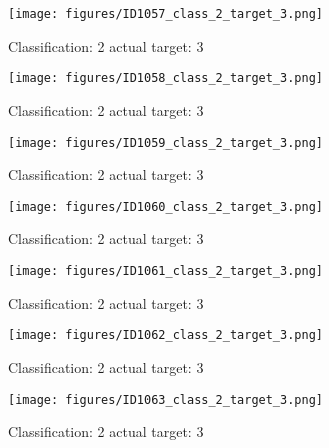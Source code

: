 \begin{figure}[h!]
\begin{center}
\texttt{[image: figures/ID1057\_class\_2\_target\_3.png]}
\end{center}
\caption{ Classification: 2 actual target: 3}
\label{fig:ID1057_class_2_target_3}
\end{figure}
\begin{figure}[h!]
\begin{center}
\texttt{[image: figures/ID1058\_class\_2\_target\_3.png]}
\end{center}
\caption{ Classification: 2 actual target: 3}
\label{fig:ID1058_class_2_target_3}
\end{figure}
\begin{figure}[h!]
\begin{center}
\texttt{[image: figures/ID1059\_class\_2\_target\_3.png]}
\end{center}
\caption{ Classification: 2 actual target: 3}
\label{fig:ID1059_class_2_target_3}
\end{figure}
\begin{figure}[h!]
\begin{center}
\texttt{[image: figures/ID1060\_class\_2\_target\_3.png]}
\end{center}
\caption{ Classification: 2 actual target: 3}
\label{fig:ID1060_class_2_target_3}
\end{figure}
\begin{figure}[h!]
\begin{center}
\texttt{[image: figures/ID1061\_class\_2\_target\_3.png]}
\end{center}
\caption{ Classification: 2 actual target: 3}
\label{fig:ID1061_class_2_target_3}
\end{figure}
\begin{figure}[h!]
\begin{center}
\texttt{[image: figures/ID1062\_class\_2\_target\_3.png]}
\end{center}
\caption{ Classification: 2 actual target: 3}
\label{fig:ID1062_class_2_target_3}
\end{figure}
\begin{figure}[h!]
\begin{center}
\texttt{[image: figures/ID1063\_class\_2\_target\_3.png]}
\end{center}
\caption{ Classification: 2 actual target: 3}
\label{fig:ID1063_class_2_target_3}
\end{figure}
